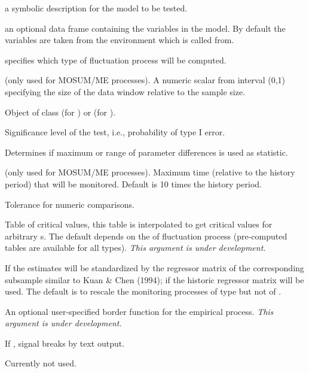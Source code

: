 \begin{Arguments}
\begin{ldescription}
\item[\code{formula}] a symbolic description for the model to be tested.
\item[\code{data}] an optional data frame containing the variables in the model. By
default the variables are taken from the environment which  is
called from.
\item[\code{type}] specifies which type of fluctuation process will be
computed.
\item[\code{h}] (only used for MOSUM/ME processes). A numeric scalar from interval
(0,1) specifying the size of the data window relative to the sample
size.
\item[\code{obj}] Object of class  (for ) or
 (for ).
\item[\code{alpha}] Significance level of the test, i.e., probability of
type I error.
\item[\code{functional}] Determines if maximum or range of parameter
differences is used as statistic.
\item[\code{period}] (only used for MOSUM/ME processes). Maximum time (relative
to the history period) that will be monitored. Default is 10 times
the history period.
\item[\code{tolerance}] Tolerance for numeric \code{==} comparisons.
\item[\code{CritvalTable}] Table of critical values, this table is
interpolated to get critical values
for arbitrary s. The default depends on the 
of fluctuation process (pre-computed tables are available for all
types). \emph{This argument is under development.}
\item[\code{rescale}] If  the estimates will be standardized by
the regressor matrix of the corresponding subsample similar to
Kuan \& Chen (1994); if  the historic regressor matrix will
be used. The default is to rescale the monitoring processes of type
 but not of .
\item[\code{border}] An optional user-specified border function for the
empirical process. \emph{This argument is under development.}
\item[\code{verbose}] If , signal breaks by text output.
\item[\code{...}] Currently not used.
\end{ldescription}
\end{Arguments}
